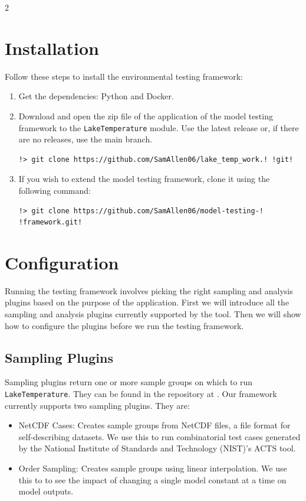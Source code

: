 \documentclass[10pt]{article}
\begin{document}
\begin{multicols}{2}
\section{Installation}
Follow these steps to install the environmental testing framework:
\begin{enumerate}
    \item Get the dependencies: Python and Docker.
    \item Download and open the zip file of the application of the model testing framework to the \verb|LakeTemperature| module. Use the latest release or, if there are no releases, use the main branch. 
\begin{lstlisting}[style=dawn]
!> git clone https://github.com/SamAllen06/lake_temp_work.! !git!
\end{lstlisting}
    \item If you wish to extend the model testing framework, clone it using the following command:
\begin{lstlisting}[style=dawn]
!> git clone https://github.com/SamAllen06/model-testing-! !framework.git!
\end{lstlisting}
\end{enumerate}

\section{Configuration}
Running the testing framework involves picking the right sampling and analysis plugins based on the purpose of the application. First we will introduce all the sampling and analysis plugins currently supported by the tool. Then we will show how to configure the plugins before we run the testing framework. 
\subsection{Sampling Plugins}
Sampling plugins return one or more sample groups on which to run \verb|LakeTemperature|. They can be found in the repository at . Our framework currently supports two sampling plugins. They are: 
\begin{itemize}
    \item NetCDF Cases: Creates sample groups from NetCDF \cite{NetCDF} files, a file format for self-describing datasets. We use this to run combinatorial test cases generated by the National Institute of Standards and Technology (NIST)'s ACTS \cite{ACTS} tool.
    \item Order Sampling: Creates sample groups using linear interpolation. We use this to to see the impact of changing a single model constant at a time on model outputs.
\end{itemize}


\end{multicols}
\end{document}
